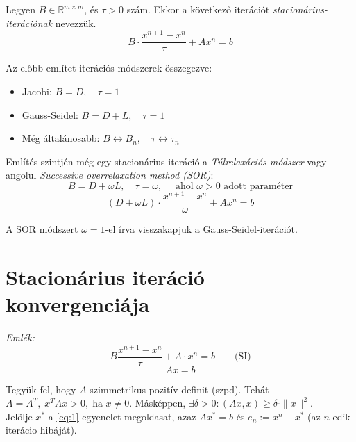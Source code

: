 \begin{definition}
    Legyen $B \in \mathbb{R}^{m\times m}$, és $\tau > 0$ szám. Ekkor a következő iterációt \textit{stacionárius-iterációnak} nevezzük.
    \begin{equation*}
        B \cdot \frac{x^{n+1}-x^{n}}{\tau} + Ax^{n} = b
    \end{equation*}
\end{definition}

\begin{megj}
    Az előbb említet iterációs módszerek összegezve:
    \begin{itemize}
        \item Jacobi: $B = D, \quad \tau = 1$
        \item Gauss-Seidel: $B = D + L, \quad \tau = 1$
        \item Még általánosabb: $B \leftrightarrow B_{n}, \quad \tau \leftrightarrow \tau_{n}$
    \end{itemize}
\end{megj}

Említés szintjén még egy stacionárius iteráció a \textit{Túlrelaxációs módszer} vagy angolul \textit{Successive overrelaxation method (SOR)}:
\begin{equation*}
    B = D + \omega L, \quad \tau = \omega, \quad \text{ ahol } \omega > 0 \text{ adott paraméter}
\end{equation*}
\begin{equation*}
    (D + \omega L)\cdot \frac{x^{n+1}-x^{n}}{\omega} + Ax^{n} = b
\end{equation*}

\begin{megj}
    A SOR módszert $\omega = 1$-el írva visszakapjuk a Gauss-Seidel-iterációt.
\end{megj}

\section{Stacionárius iteráció konvergenciája}
\textit{Emlék:}
\begin{equation*}
    B \frac{x^{n+1} - x^{n}}{\tau} + A \cdot x^{n} = b \qquad \text{(SI)}
\end{equation*}
\begin{equation*}
    Ax = b
\end{equation*}

Tegyük fel, hogy $A$ szimmetrikus pozitív definit (szpd). Tehát $A = A^{T},\; x^{T}Ax > 0, \; \text{ha } x \neq 0$. Másképpen, $\exists \delta > 0: (Ax, x) \geq \delta \cdot \| x \|^{2}$. \\
Jelölje $x^{*}$ a \ref{eq:1} egyenelet megoldasat, azaz $Ax^{*} = b$ és $e_{n}:=x^{n}-x^{*}$ (az $n$-edik iterácio hibáját).

